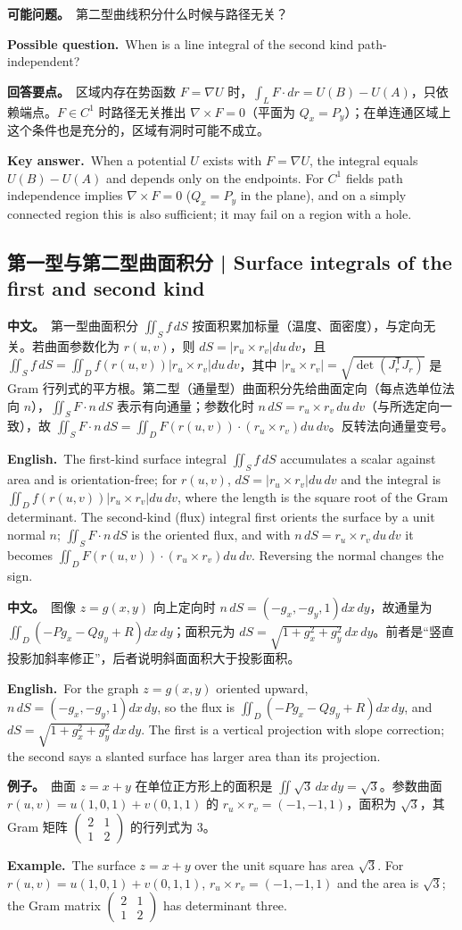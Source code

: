 \documentclass[UTF8,11pt,a4paper]{ctexart}
\newcommand{\BOTH}[2]{\par\noindent\textbf{中文。}\ #1\par\noindent\textbf{English.}\ #2\par}
\newcommand{\EX}[2]{\par\noindent\textbf{例子。}\ #1\par\noindent\textbf{Example.}\ #2\par}
\newcommand{\ASK}[4]{\begin{samepage}\par\noindent\textbf{可能问题。}\ #1\par\noindent\textbf{Possible question.}\ #2\par\noindent\textbf{回答要点。}\ #3\par\noindent\textbf{Key answer.}\ #4\medskip\end{samepage}}
\begin{document}
\ASK{第二型曲线积分什么时候与路径无关？}{When is a line integral of the second kind path-independent?}{区域内存在势函数 $F=\nabla U$ 时，$\int_LF\cdot dr=U(B)-U(A)$，只依赖端点。$F\in C^1$ 时路径无关推出 $\nabla\times F=0$（平面为 $Q_x=P_y$）；在单连通区域上这个条件也是充分的，区域有洞时可能不成立。}{When a potential $U$ exists with $F=\nabla U$, the integral equals $U(B)-U(A)$ and depends only on the endpoints. For $C^1$ fields path independence implies $\nabla\times F=0$ ($Q_x=P_y$ in the plane), and on a simply connected region this is also sufficient; it may fail on a region with a hole.}

\subsection{第一型与第二型曲面积分 | Surface integrals of the first and second kind}
\BOTH{第一型曲面积分 $\iint_Sf\,dS$ 按面积累加标量（温度、面密度），与定向无关。若曲面参数化为 $r(u,v)$，则 $dS=|r_u\times r_v|du\,dv$，且 $\iint_Sf\,dS=\iint_Df(r(u,v))|r_u\times r_v|du\,dv$，其中 $|r_u\times r_v|=\sqrt{\det(J_r^{\mathsf T}J_r)}$ 是 Gram 行列式的平方根。第二型（通量型）曲面积分先给曲面定向（每点选单位法向 $n$），$\iint_SF\cdot n\,dS$ 表示有向通量；参数化时 $n\,dS=r_u\times r_v\,du\,dv$（与所选定向一致），故 $\iint_SF\cdot n\,dS=\iint_DF(r(u,v))\cdot(r_u\times r_v)du\,dv$。反转法向通量变号。}{The first-kind surface integral $\iint_Sf\,dS$ accumulates a scalar against area and is orientation-free; for $r(u,v)$, $dS=|r_u\times r_v|du\,dv$ and the integral is $\iint_Df(r(u,v))|r_u\times r_v|du\,dv$, where the length is the square root of the Gram determinant. The second-kind (flux) integral first orients the surface by a unit normal $n$; $\iint_SF\cdot n\,dS$ is the oriented flux, and with $n\,dS=r_u\times r_v\,du\,dv$ it becomes $\iint_DF(r(u,v))\cdot(r_u\times r_v)du\,dv$. Reversing the normal changes the sign.}
\BOTH{图像 $z=g(x,y)$ 向上定向时 $n\,dS=(-g_x,-g_y,1)dx\,dy$，故通量为 $\iint_D(-Pg_x-Qg_y+R)dx\,dy$；面积元为 $dS=\sqrt{1+g_x^2+g_y^2}\,dx\,dy$。前者是“竖直投影加斜率修正”，后者说明斜面面积大于投影面积。}{For the graph $z=g(x,y)$ oriented upward, $n\,dS=(-g_x,-g_y,1)dx\,dy$, so the flux is $\iint_D(-Pg_x-Qg_y+R)dx\,dy$, and $dS=\sqrt{1+g_x^2+g_y^2}\,dx\,dy$. The first is a vertical projection with slope correction; the second says a slanted surface has larger area than its projection.}
\EX{曲面 $z=x+y$ 在单位正方形上的面积是 $\iint\sqrt3\,dx\,dy=\sqrt3$。参数曲面 $r(u,v)=u(1,0,1)+v(0,1,1)$ 的 $r_u\times r_v=(-1,-1,1)$，面积为 $\sqrt3$，其 Gram 矩阵 $\begin{pmatrix}2&1\\1&2\end{pmatrix}$ 的行列式为 $3$。}{The surface $z=x+y$ over the unit square has area $\sqrt3$. For $r(u,v)=u(1,0,1)+v(0,1,1)$, $r_u\times r_v=(-1,-1,1)$ and the area is $\sqrt3$; the Gram matrix $\begin{pmatrix}2&1\\1&2\end{pmatrix}$ has determinant three.}
\end{document}
